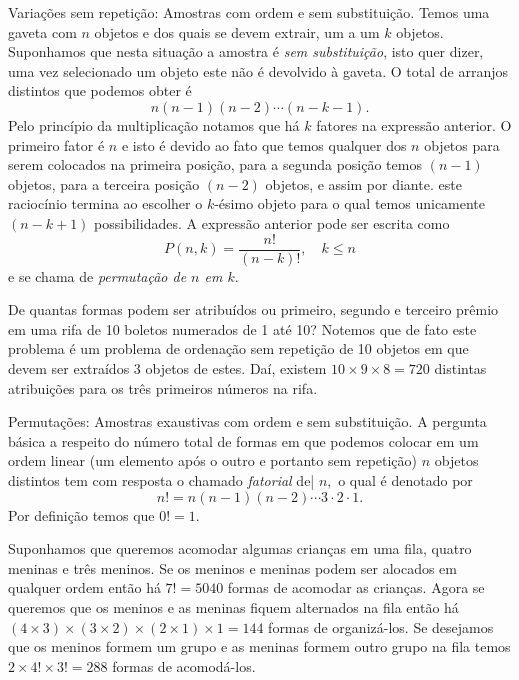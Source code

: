 \begin{frame}{Variações sem repetição: Amostras com ordem e sem substituição.} Temos uma gaveta com $n$ objetos e dos quais se devem extrair, um a um $k$ objetos. Suponhamos que nesta situação a amostra é {\it sem substituição}, isto quer dizer, uma vez selecionado um  objeto este não é devolvido à gaveta. O total de arranjos distintos que podemos obter é 
\begin{equation}
\label{perm1}
n(n-1)(n-2)\cdots (n-k-1). 
\end{equation}
Pelo princípio da multiplicação notamos que há $k$ fatores na expressão anterior. O primeiro fator é $n$ e isto é devido ao fato que temos qualquer dos $n$ objetos para serem colocados na primeira posição, para a segunda posição temos $(n-1)$ objetos, para a terceira posição $(n-2)$ objetos, e assim por diante. este raciocínio termina ao escolher o $k$-ésimo objeto para o qual temos unicamente $(n-k+1)$ possibilidades. A expressão anterior pode ser escrita como 
$$
P(n,k) = \frac{n!}{(n-k)!}, \quad k \leq n
$$ 
e se chama de {\it permutação de $n$ em $k$}. 
\begin{exem}
De quantas formas podem ser atribuídos ou primeiro, segundo e terceiro prêmio em uma rifa de 10 boletos numerados de 1 até 10? Notemos que de fato este problema é um problema de ordenação sem repetição de 10 objetos em que devem ser extraídos 3 objetos de estes. Daí, existem $10\times 9\times 8=720 $ distintas atribuições para os três primeiros números na rifa. 
\end{exem}


\end{frame}


\begin{frame}{Permutações: Amostras exaustivas com ordem e sem substituição.} A pergunta básica a respeito do número total de formas em que podemos colocar em um ordem linear (um  elemento após o outro e portanto sem repetição) $n$ objetos distintos tem com resposta o chamado {\it fatorial} de| $n,$ o qual é denotado por $$n! = n(n-1)(n-2)\cdots 3\cdot 2 \cdot 1.$$ Por definição temos que $0!=1.$

\begin{exem}
Suponhamos que queremos acomodar algumas crianças em uma fila, quatro meninas e três meninos. Se os meninos e meninas podem ser alocados em qualquer ordem então há $7!=5040$ formas de acomodar as crianças. Agora se queremos que os meninos e as meninas fiquem alternados na fila então há 
$(4\times 3) \times (3\times 2) \times (2\times 1) \times 1 = 144$ formas de organizá-los. Se desejamos que os meninos formem um grupo e as meninas formem outro grupo na fila temos $2\times 4! \times 3! =288$ formas de acomodá-los. 
\end{exem}

\end{frame}


